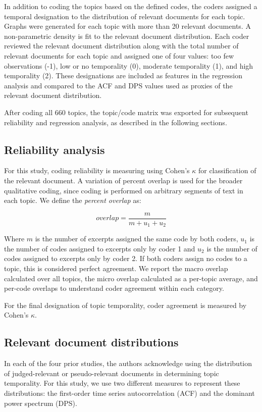 \documentclass[runningheads,a4paper]{llncs}
\begin{document}
In addition to coding the topics based on the defined codes, the coders assigned a temporal designation to the distribution of relevant documents for each topic. Graphs were generated for each topic with more than 20 relevant documents.  A non-parametric density is fit to the relevant document distribution. Each coder reviewed the relevant document distribution along with the total number of relevant documents for each topic and assigned one of four values:  too few observations (-1), low or no temporality (0), moderate temporality (1), and high temporality (2). These designations are included as features in the regression analysis and compared to the ACF and DPS values used as proxies of the relevant document distribution.
 
After coding all 660 topics, the topic/code matrix was exported for subsequent reliability and regression analysis, as described in the following sections. 

\subsection{Reliability analysis}

For this study, coding reliability is measuring using Cohen's $\kappa$ for classification of the relevant document. A variation of percent overlap is used for the broader qualitative coding, since coding is performed on arbitrary segments of text in each topic.  We define the \emph{percent overlap} as:

\[
overlap = \frac{m}{m + u_1 + u_2} 
\]

Where $m$ is the number of excerpts assigned the same code by both coders, $u_1$ is the number of codes assigned to excerpts only by coder 1 and $u_2$ is the number of codes assigned to excerpts only by coder 2. If both coders assign no codes to a topic, this is considered perfect agreement. We report the macro overlap calculated over all topics, the micro overlap calculated as a per-topic average, and per-code overlaps to understand coder agreement within each category.

For the final designation of topic temporality, coder agreement is measured by Cohen's $\kappa$.

\subsection{Relevant document distributions}

In each of the four prior studies, the authors acknowledge using the distribution of judged-relevant or pseudo-relevant documents in determining topic temporality. For this study, we use two different measures to represent these distributions: the first-order time series autocorrelation (ACF) and the dominant power spectrum (DPS).
\end{document}

